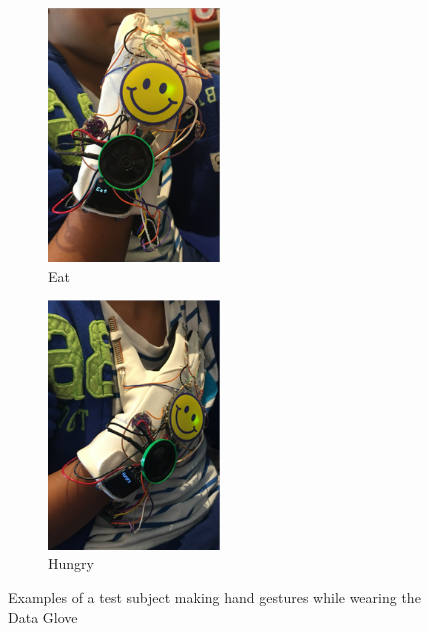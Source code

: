 \begin{figure}
    \begin{subfigure}
        \centering
        \includegraphics[width=0.5\textwidth]{./assets/img/Eat}
        \caption{Eat}
        \label{fig:eat}
    \end{subfigure}
    \begin{subfigure}
        \centering
        \includegraphics[width=0.5\textwidth]{./assets/img/Hungry}
        \caption{Hungry}
        \label{fig:hungry}
    \end{subfigure}
    \caption{Examples of a test subject making hand gestures while wearing the Data Glove}
    \label{fig:examplegestures2}
\end{figure}

